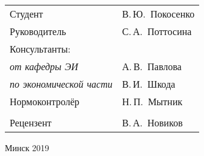 \begin{titlepage}
\begin{center}
    \begin{tabular}{ p{}p{} }
      Студент & В.\,Ю.~Покосенко \\
      Руководитель & С.\,А.~Поттосина \\
      Консультанты: &\\
      \hspace*{3ex}\emph{от кафедры ЭИ} & А.\,В.~Павлова \\
      \hspace*{3ex}\emph{по экономической части} & В.\,И.~Шкода \\
      Нормоконтролёр & Н.\,П.~Мытник\\
      & \\
      Рецензент & В.\,А.~Новиков 
    \end{tabular}
    
    \vfill
    {\normalsize Минск 2019}
  \end{center}
\end{titlepage}
